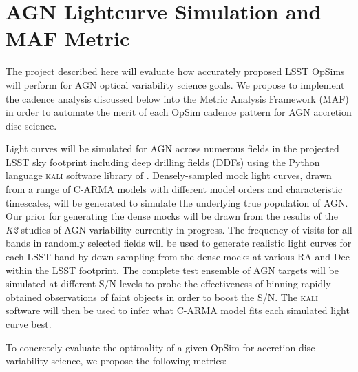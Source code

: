 \documentclass[times,preprint]{aastex}
\begin{document}
\section{AGN Lightcurve Simulation and MAF Metric}

The project described here will evaluate how accurately proposed LSST OpSims will perform for AGN optical variability science goals. We propose to implement the cadence analysis discussed below into the Metric Analysis Framework (MAF) in order to automate the merit of each OpSim cadence pattern for AGN accretion disc science.

Light curves will be simulated for AGN across numerous fields in the projected LSST sky footprint including deep drilling fields (DDFs) using the Python language \textsc{k\={a}l\={i}} software library of \citet{KasliwalCARMA}. Densely-sampled mock light curves, drawn from a range of C-ARMA models with different model orders and characteristic timescales, will be generated to simulate the underlying true population of AGN. Our prior for generating the dense mocks will be drawn from the results of the \textit{K2} studies of AGN variability currently in progress. The frequency of visits for all bands in randomly selected fields will be used to generate realistic light curves for each LSST band by down-sampling from the dense mocks at various RA and Dec within the LSST footprint.  The complete test ensemble of AGN targets will be simulated at different S/N levels to probe the effectiveness of binning rapidly-obtained observations of faint objects in order to boost the S/N. The \textsc{k\={a}l\={i}} software will then be used to infer what C-ARMA model fits each simulated light curve best.

To concretely evaluate the optimality of a given OpSim for accretion disc variability science, we propose the following metrics: 
\end{document}
